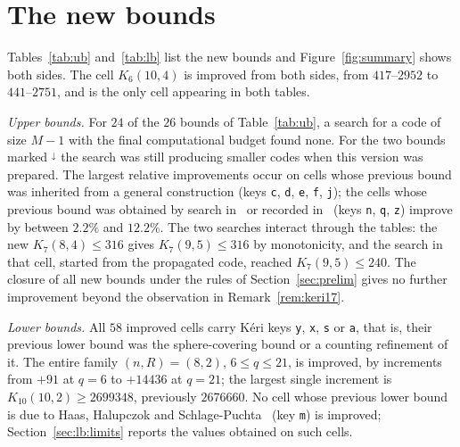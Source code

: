 \documentclass[11pt]{amsart}
\newcommand{\Kq}[3]{K_{#1}(#2,#3)}
\begin{document}
\section{The new bounds}\label{sec:results}

Tables~\ref{tab:ub} and~\ref{tab:lb} list the new bounds and
Figure~\ref{fig:summary} shows both sides. The cell $\Kq{6}{10}{4}$ is
improved from both sides, from $417$--$2952$ to $441$--$2751$, and is the
only cell appearing in both tables.

\emph{Upper bounds.} For $24$ of the $26$ bounds of Table~\ref{tab:ub}, a
search for a code of size $M-1$ with the final computational budget found
none. For the two bounds marked ${}^{\downarrow}$ the search was still
producing smaller codes when this version was prepared. The largest
relative improvements occur on cells whose previous bound was inherited
from a general construction (keys \texttt{c}, \texttt{d}, \texttt{e},
\texttt{f}, \texttt{j}); the cells whose previous bound was obtained by
search in~\cite{KeriOstergard2005} or recorded in~\cite{Keri} (keys
\texttt{n}, \texttt{q}, \texttt{z}) improve by between $2.2\%$ and
$12.2\%$. The two searches interact through the tables: the new
$\Kq{7}{8}{4}\le 316$ gives $\Kq{7}{9}{5}\le 316$ by monotonicity, and the
search in that cell, started from the propagated code, reached
$\Kq{7}{9}{5}\le 240$. The closure of all new bounds under the rules of
Section~\ref{sec:prelim} gives no further improvement beyond the
observation in Remark~\ref{rem:keri17}.

\emph{Lower bounds.} All $58$ improved cells carry K\'eri keys \texttt{y},
\texttt{x}, \texttt{s} or \texttt{a}, that is, their previous lower bound
was the sphere-covering bound or a counting refinement of it. The entire
family $(n,R)=(8,2)$, $6\le q\le 21$, is improved, by increments from
$+91$ at $q=6$ to $+14436$ at $q=21$; the largest single increment is
$\Kq{10}{10}{2}\ge 2699348$, previously $2676660$. No cell whose previous
lower bound is due to Haas, Halupczok and Schlage-Puchta~\cite{HHSP2009}
(key \texttt{m}) is improved; Section~\ref{sec:lb:limits} reports the
values obtained on such cells.

\begin{table}[t]
\centering
\small
\ubtable
\caption{New upper bounds. ``Previous bounds'' are the lower and upper
bounds of~\cite{Keri}; a bold lower bound is from Table~\ref{tab:lb}.
``Sphere'' is $\lceil q^n/|B_R|\rceil$. ``Key'' is the source annotation
of the previous upper bound in~\cite{Keri}: \ubkeylegend. ``Via'' is the
method that found the code: L $=$ the local search of
Section~\ref{sec:ls}, T $=$ the large neighbourhood search of
Section~\ref{sec:lns}. Percentages are rounded to one decimal. For the two
bounds marked ${}^{\downarrow}$ the search was still producing smaller
codes when this version was prepared; for every other bound a search at
$M-1$ with the final budget found no code.}
\label{tab:ub}
\end{table}
\end{document}
